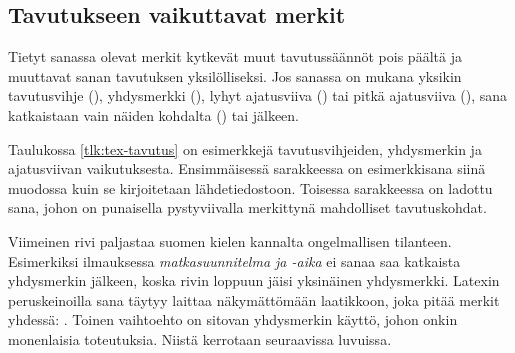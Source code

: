 \subsection{Tavutukseen vaikuttavat merkit}

Tietyt sanassa olevat merkit kytkevät muut tavutussäännöt pois päältä ja
muuttavat sanan tavutuksen yksilölliseksi. Jos sanassa on mukana yksikin
tavutusvihje (\koodi{\keno-}), yhdysmerkki (\koodi{-}), lyhyt
ajatusviiva (\koodi{--}) tai pitkä ajatusviiva (\koodi{---}), sana
katkaistaan vain näiden kohdalta (\koodi{\keno-}) tai jälkeen.


Taulukossa \ref{tlk:tex-tavutus} on esimerkkejä tavutusvihjeiden,
yhdysmerkin ja ajatusviivan vaikutuksesta. Ensimmäisessä sarakkeessa on
esimerkkisana siinä muodossa kuin se kirjoitetaan lähdetiedostoon.
Toisessa sarakkeessa on ladottu sana, johon on punaisella pystyviivalla
merkittynä mahdolliset tavutuskohdat.

Viimeinen rivi paljastaa suomen kielen kannalta ongelmallisen tilanteen.
Esimerkiksi ilmauksessa \emph{matkasuunnitelma ja \mbox{-aika}} ei sanaa
saa katkaista yhdysmerkin jälkeen, koska rivin loppuun jäisi yksinäinen
yhdysmerkki. Latexin peruskeinoilla sana täytyy laittaa näkymättömään
laatikkoon, joka pitää merkit yhdessä: .
Toinen vaihto\-ehto on sitovan yhdysmerkin käyttö, johon onkin
monenlaisia toteutuksia. Niistä kerrotaan seuraavissa luvuissa.

